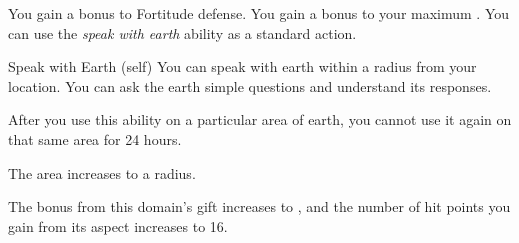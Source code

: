              You gain a  bonus to Fortitude defense.
             You gain a  bonus to your maximum .
             You can use the \textit{speak with earth} ability as a standard action.
            \begin{attuneability}{Speak with Earth}
                 (self)
                \rankline
                You can speak with earth within a \areahuge radius  from your location.
                You can ask the earth simple questions and understand its responses.

                After you use this ability on a particular area of earth, you cannot use it again on that same area for 24 hours.

                \rankline
                 The area increases to a \areagarg radius.
            \end{attuneability}
             The bonus from this domain's gift increases to , and the number of hit points you gain from its aspect increases to 16.

